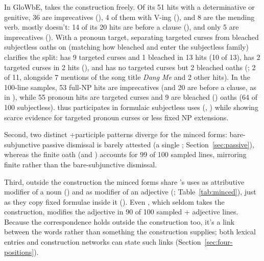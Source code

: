 \documentclass[12pt]{article}
\begin{document}
In GloWbE,  takes the construction freely. Of its 51 hits with a determinative or genitive, 36 are imprecatives (), 4 of them with  V-ing (), and 8 are the mending verb.  mostly doesn't: 14 of its 20 hits are  before a clause (), and only 5 are imprecatives (). With a pronoun target, separating targeted curses from bleached subjectless oaths on  (matching how bleached  and  enter the subjectless family) clarifies the split:  has 9 targeted curses and 1 bleached  in 13 hits (10 of 13),  has 2 targeted curses in 2 hits (), and  has no targeted curses but 2 bleached oaths (; 2 of 11, alongside 7 mentions of the song title \emph{Dang Me} and 2 other hits). In the 100-line  samples, 53 full-NP hits are imprecatives (and 20 are  before a clause, as in ), while 55 pronoun hits are targeted curses and 9 are bleached  () oaths (64 of 100 subjectless).  thus participates in formulaic subjectless uses (, ) while showing scarce evidence for targeted pronoun curses or less fixed NP extensions.

Second, two distinct +participle patterns diverge for the minced forms: bare-subjunctive passive dismissal is barely attested (a single ; Section~\ref{sec:passive}), whereas the finite oath  (and ) accounts for 99 of 100 sampled  lines, mirroring finite  rather than the bare-subjunctive dismissal.

Third, outside the construction the minced forms share 's uses as attributive modifier of a noun () and as modifier of an adjective (; Table~\ref{tab:minced}), just as they copy fixed formulae inside it (). Even , which seldom takes the construction, modifies the adjective in 90 of 100 sampled  + adjective lines. Because the correspondence holds outside the construction too, it's a link between the words rather than something the construction supplies; both lexical entries and construction networks can state such links (Section~\ref{sec:four-positions}).
\end{document}
